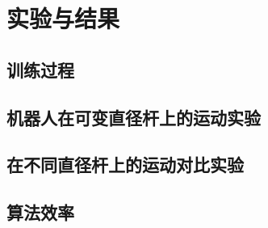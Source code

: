 \chapter{实验与结果}
\label{cha:experiment}

\section{训练过程}

\section{机器人在可变直径杆上的运动实验}

\section{在不同直径杆上的运动对比实验}

\section{算法效率}

